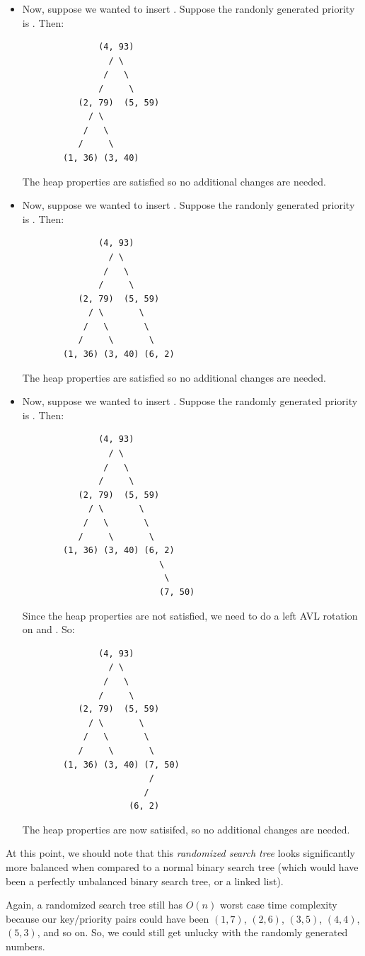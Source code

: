 \documentclass[letterpaper]{article}
\begin{document}
\begin{itemize}
    \item Now, suppose we wanted to insert . Suppose the randonly generated priority is . Then: 
    \begin{verbatim}
               (4, 93)
                 / \ 
                /   \ 
               /     \ 
           (2, 79)  (5, 59)
             / \ 
            /   \ 
           /     \ 
        (1, 36) (3, 40)   
    \end{verbatim}
    The heap properties are satisfied so no additional changes are needed. 

    \item Now, suppose we wanted to insert . Suppose the randonly generated priority is . Then: 
    \begin{verbatim}
               (4, 93)
                 / \ 
                /   \ 
               /     \ 
           (2, 79)  (5, 59)
             / \       \ 
            /   \       \ 
           /     \       \ 
        (1, 36) (3, 40) (6, 2)
    \end{verbatim}
    The heap properties are satisfied so no additional changes are needed.

    \item Now, suppose we wanted to insert . Suppose the randomly generated priority is . Then:  
    \begin{verbatim}
               (4, 93)
                 / \ 
                /   \ 
               /     \ 
           (2, 79)  (5, 59)
             / \       \ 
            /   \       \ 
           /     \       \ 
        (1, 36) (3, 40) (6, 2)
                           \ 
                            \
                           (7, 50)
    \end{verbatim}
    Since the heap properties are not satisfied, we need to do a left AVL rotation on  and . So: 
    \begin{verbatim}
               (4, 93)
                 / \ 
                /   \ 
               /     \ 
           (2, 79)  (5, 59)
             / \       \ 
            /   \       \ 
           /     \       \ 
        (1, 36) (3, 40) (7, 50)
                         / 
                        /  
                     (6, 2)
    \end{verbatim}
    The heap properties are now satisifed, so no additional changes are needed. 
\end{itemize}

At this point, we should note that this \emph{randomized search tree} looks significantly more balanced when compared to a normal binary search tree (which would have been a perfectly unbalanced binary search tree, or a linked list). 

\bigskip 

Again, a randomized search tree still has $O(n)$ worst case time complexity because our key/priority pairs could have been $(1, 7)$, $(2, 6)$, $(3, 5)$, $(4, 4)$, $(5, 3)$, and so on. So, we could still get unlucky with the randomly generated numbers. 
\end{document}
